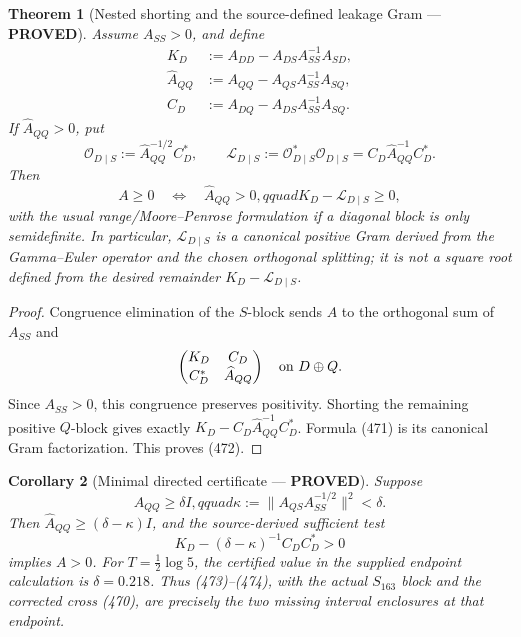 \documentclass[11pt]{article}
\newtheorem{theorem}{Theorem}
\newtheorem{corollary}[theorem]{Corollary}
\newcommand{\PROVED}{\textcolor{green!45!black}{\textbf{PROVED}}}
\begin{document}
\begin{theorem}[Nested shorting and the source-defined leakage Gram ---
\PROVED]
Assume \(A_{SS}>0\), and define
\begin{align}
 K_D&:=A_{DD}-A_{DS}A_{SS}^{-1}A_{SD},\tag{468}\\
 \widehat A_{QQ}&:=A_{QQ}-A_{QS}A_{SS}^{-1}A_{SQ},\tag{469}\\
 C_D&:=A_{DQ}-A_{DS}A_{SS}^{-1}A_{SQ}.\tag{470}
\end{align}
If \(\widehat A_{QQ}>0\), put
\begin{equation}
 \mathscr O_{D\mid S}:=\widehat A_{QQ}^{-1/2}C_D^*,\qquad
 \mathscr L_{D\mid S}:=\mathscr O_{D\mid S}^*\mathscr O_{D\mid S}
 =C_D\widehat A_{QQ}^{-1}C_D^*.                    \tag{471}
\end{equation}
Then
\begin{equation}
 A\ge0
 \quad\Longleftrightarrow\quad
 \widehat A_{QQ}>0,qquad K_D-\mathscr L_{D\mid S}\ge0,          \tag{472}
\end{equation}
with the usual range/Moore--Penrose formulation if a diagonal block is
only semidefinite.  In particular, \(\mathscr L_{D\mid S}\) is a canonical
positive Gram derived from the Gamma--Euler operator and the chosen
orthogonal splitting; it is not a square root defined from the desired
remainder \(K_D-\mathscr L_{D\mid S}\).
\end{theorem}

\begin{proof}
Congruence elimination of the \(S\)-block sends \(A\) to the orthogonal
sum of \(A_{SS}\) and
\[
 \begin{pmatrix}K_D&C_D\\ C_D^*&\widehat A_{QQ}\end{pmatrix}
 \quad\hbox{on }D\oplus Q.
\]
Since \(A_{SS}>0\), this congruence preserves positivity.  Shorting the
remaining positive \(Q\)-block gives exactly
\(K_D-C_D\widehat A_{QQ}^{-1}C_D^*\).  Formula (471) is its canonical
Gram factorization.  This proves (472).
\end{proof}

\begin{corollary}[Minimal directed certificate --- \PROVED]
Suppose
\begin{equation}
 A_{QQ}\ge\delta I,qquad
 \kappa:=\|A_{QS}A_{SS}^{-1/2}\|^2<\delta.           \tag{473}
\end{equation}
Then \(\widehat A_{QQ}\ge(\delta-\kappa)I\), and the source-derived
sufficient test
\begin{equation}
 K_D-(\delta-\kappa)^{-1}C_DC_D^*>0                 \tag{474}
\end{equation}
implies \(A>0\).
For \(T=\frac12\log5\), the certified value in the supplied endpoint
calculation is \(\delta=0.218\).  Thus (473)--(474), with the actual
\(S_{163}\) block and the corrected cross (470), are precisely the two
missing interval enclosures at that endpoint.
\end{corollary}
\end{document}
